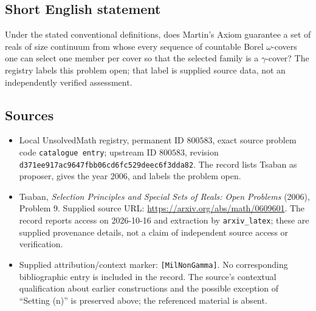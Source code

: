 \documentclass[11pt]{article}
\begin{document}
\subsection{Short English statement}
Under the stated conventional definitions, does Martin's Axiom guarantee a set of reals of size continuum from whose every sequence of countable Borel \(\omega\)-covers one can select one member per cover so that the selected family is a \(\gamma\)-cover? The registry labels this problem open; that label is supplied source data, not an independently verified assessment.
\subsection{Sources}
\begin{itemize}
\item Local UnsolvedMath registry, permanent ID \(800583\), exact source problem code \texttt{catalogue entry}; upstream ID \(800583\), revision \texttt{d371ee917ac9647fbb06cd6fc529deec6f3dda82}. The record lists Tsaban as proposer, gives the year \(2006\), and labels the problem open.
\item Tsaban, \emph{Selection Principles and Special Sets of Reals: Open Problems} (2006), Problem 9. Supplied source URL: \url{https://arxiv.org/abs/math/0609601}. The record reports access on 2026-10-16 and extraction by \texttt{arxiv\_latex}; these are supplied provenance details, not a claim of independent source access or verification.
\item Supplied attribution/context marker: \texttt{[MilNonGamma]}. No corresponding bibliographic entry is included in the record. The source's contextual qualification about earlier constructions and the possible exception of ``Setting (n)'' is preserved above; the referenced material is absent.
\end{itemize}
\end{document}
